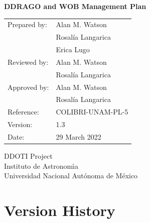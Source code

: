 \documentclass{article}
\begin{document}
\pagestyle{empty}

\begin{center}

{\Large \bfseries DDRAGO and WOB Management Plan}

\vspace{2cm}

\begin{tabular}{ll}
Prepared by:&Alan M. Watson\\
&Rosalía Langarica\\
&Erica Lugo\\
Reviewed by:&Alan M. Watson\\
&Rosalía Langarica\\
Approved by:&Alan M. Watson\\
&Rosalía Langarica\\
Reference:&COLIBRI-UNAM-PL-5\\
Version:&1.3\\
Date:&29 March 2022\\
\end{tabular}

\vspace{\fill}

DDOTI Project\\
Instituto de Astronom{\'\i}a\\
Universidad Nacional Aut\'onoma de M\'exico

\end{center}

\newpage


\pagestyle{plain}

\setcounter{tocdepth}{2}
\tableofcontents
\newpage




\clearpage
\section*{Version History}
\end{document}
